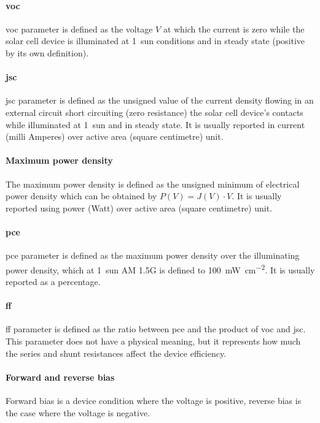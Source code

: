 		\paragraph{\Glsdesc{voc}} \Gls{voc} parameter is defined as the voltage $V$ at which the current is zero while the solar cell device is illuminated at 1~sun conditions and in steady state (positive by its own definition).

		\paragraph{\Glsdesc{jsc}} \Gls{jsc} parameter is defined as the unsigned value of the current density flowing in an external circuit short circuiting (zero resistance) the solar cell device's contacts while illuminated at 1~sun and in steady state.
		It is usually reported in current (milli Amperes) over active area (square centimetre) unit.

		\paragraph{Maximum power density} The maximum power density is defined as the unsigned minimum of electrical power density which can be obtained by $P(V) = J(V) \cdot V$.
		It is usually reported using power (Watt) over active area (square centimetre) unit.

		\paragraph{\Glsdesc{pce}} \Gls{pce} parameter is defined as the maximum power density over the illuminating power density, which at 1~sun AM 1.5G is defined to \SI{100}{\mW\per\square\cm}.
		It is usually reported as a percentage.

		\paragraph{\Glsdesc{ff}} \Gls{ff} parameter is defined as the ratio between \gls{pce} and the product of \gls{voc} and \gls{jsc}.
		This parameter does not have a physical meaning, but it represents how much the series and shunt resistances affect the device efficiency.

		\paragraph{Forward and reverse bias} Forward bias is a device condition where the voltage is positive, reverse bias is the case where the voltage is negative.


